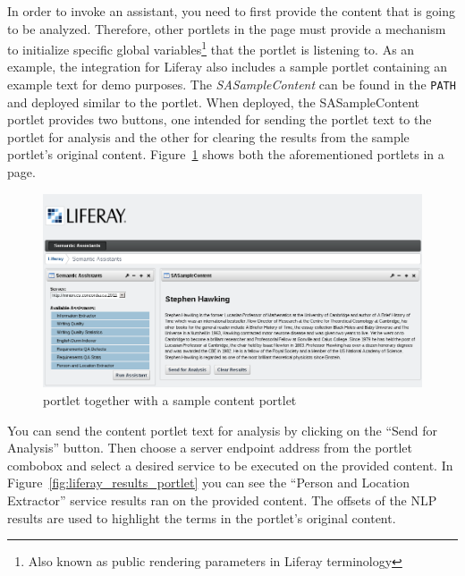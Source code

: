 \blankline

In order to invoke an assistant, you need to first provide the content that is going to be analyzed. Therefore, other portlets in the page must provide a mechanism to initialize specific global variables\footnote{Also known as public rendering parameters in Liferay terminology} that the \sa portlet is listening to. As an example, the \sa integration for Liferay also includes a sample portlet containing an example text for demo purposes. The \emph{SASampleContent} can be found in the \texttt{PATH} and deployed similar to the \sa portlet. When deployed, the SASampleContent portlet provides two buttons, one intended for sending the portlet text to the \sa portlet for analysis and the other for clearing the results from the sample portlet's original content. Figure~\ref{fig:liferay_both_portlets} shows both the aforementioned portlets in a page.

\begin{figure}
\centering
\includegraphics[scale=0.6]{pictures/liferay_both_portlets.png}
\caption{\sa portlet together with a sample content portlet}
\label{fig:liferay_both_portlets}
\end{figure}

You can send the content portlet text for analysis by clicking on the ``Send for Analysis'' button. Then choose a server endpoint address from the \sa portlet combobox and select a desired service to be executed on the provided content. In Figure~\ref{fig:liferay_results_portlet} you can see the ``Person and Location Extractor'' service results ran on the provided content. The offsets of the NLP results are used to highlight the terms in the portlet's original content.

